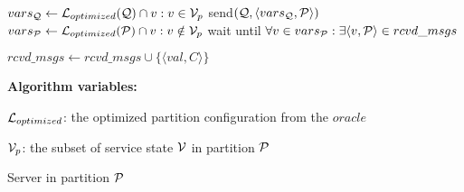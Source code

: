 \begin{algorithm}[htbp!]
\begin{distribalgo}[1]
\vspace{1.0mm}
		\STATE $vars_{\mathcal{Q}} \leftarrow \mathcal{L}_{optimized}(\mathcal{Q}) \cap v:v \in \mathcal{V}_p$
		\STATE send$(\mathcal{Q}, \langle vars_{\mathcal{Q}}, \mathcal{P} \rangle )$
	\ENDFOR
	\STATE $vars_{\mathcal{P}} \leftarrow \mathcal{L}_{optimized}(\mathcal{P}) \cap v:v \notin \mathcal{V}_p$
	\STATE wait until $\forall v \in vars_{\mathcal{P}}: \exists \langle v, \mathcal{P} \rangle \in rcvd\_msgs$
\ENDINDENT

\vspace{1.0mm}
    \STATE $rcvd\_msgs \leftarrow rcvd\_msgs \cup \{\langle val, C \rangle\}$
\ENDINDENT

\vspace{1.5mm}

\textbf{Algorithm variables:}

\vspace{1mm}

$\mathcal{L}_{optimized}$: the optimized partition configuration from the $oracle$

$\mathcal{V}_p$: the subset of service state $\mathcal{V}$ in partition $\mathcal{P}$


\caption{Server in partition $\mathcal{P}$}
\label{alg:dynastar-server_proxy}
\end{distribalgo}
\end{algorithm}
